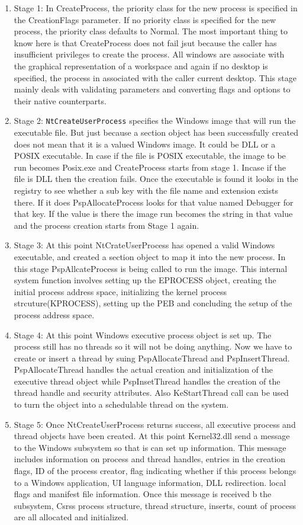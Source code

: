 \documentclass[letterpaper,10pt,draftclsnofoot,onecolumn]{IEEEtran}
\begin{document}
\begin{enumerate}
\item Stage 1: In CreateProcess, the priority class for the new process is specified in the CreationFlags parameter. If no priority class is specified for the new process, the priority class defaults to Normal. The most important thing to know here is that CreateProcess does not fail jsut because the caller has insufficient privileges to create the process. All windows are associate with the graphical representation of a workspace and again if no desktop is specified, the process in associated with the caller current desktop. This stage mainly deals with validating parameters and converting flags and options to their native counterparts.
\item Stage 2: \verb|NtCreateUserProcess| specifies the Windows image that will run the executable file. But just because a section object has been successfully created does not mean that it is a valued Windows image. It could be DLL or a POSIX executable. In case if the file is POSIX executable, the image to be run becomes Posix.exe and CreateProcess starts from stage 1. Incase if the file is DLL then the creation fails. Once the executable is found it looks in the registry to see whether a sub key with the file name and extension exists there. If it does PspAllocateProcess looks for that value named Debugger for that key. If the value is there the image run becomes the string in that value and the process creation starts from Stage 1 again.
\item Stage 3: At this point NtCrateUserProcess has opened a valid Windows executable, and created a section object to map it into the new process. In this stage PspAllcateProcess is being called to run the image. This internal system function involves setting up the EPROCESS object, creating the initial process address space, initializing the kernel process strcuture(KPROCESS), setting up the PEB and concluding the setup of the process address space.
\item Stage 4: At this point Windows executive process object is set up. The process still has no threads so it will not be doing anything. Now we have to create or insert a thread by suing PspAllocateThread and PspInsertThread. PspAllocateThread handles the actual creation and initialization of the executive thread object while PspInsetThread handles the creation of the thread handle and security attributes. Also KeStartThread call can be used to turn the object into a schedulable thread on the system.
\item Stage 5: Once NtCreateUserProcess returns success, all executive process and thread objects have been created. At this point Kernel32.dll send a message to the Windows subsystem so that is can set up information. This message includes information on process and thread handles, entries in the creation flags, ID of the process creator, flag indicating whether if this process belongs to a Windows application, UI language information, DLL redirection. local flags and manifest file information. Once this message is received b the subsystem, Csrss process structure, thread structure, inserts, count of process are all allocated and initialized.

\end{enumerate}
\end{document}
